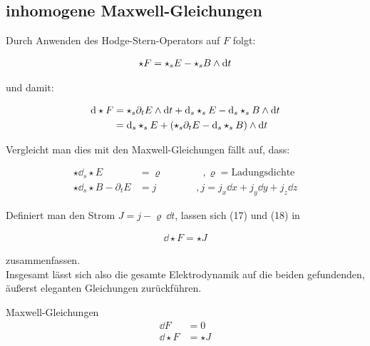\subsection{inhomogene Maxwell-Gleichungen}
Durch Anwenden des Hodge-Stern-Operators auf $F$ folgt:

\begin{align}
\star F = \star_s E - \star_s B \wedge \dd t 
\end{align}

und damit:

\begin{align}
\dd \star F &= \star_s \partial_t E  \wedge \dd t + \dd_s \star_s E - \dd_s \star_s B \wedge \dd t \notag \\
				&= \dd_s \star_s E + (\star_s \partial_t E - \dd_s \star_s B) \wedge \dd t 
\end{align}

Vergleicht man dies mit den Maxwell-Gleichungen fällt auf, dass:

\begin{align}
\star \dd_s \star E &= \varrho \qquad\qquad,\varrho=\text{Ladungsdichte} \\
\star \dd_s\star B - \partial_t E &= j \qquad\qquad ,j=j_x \dd x + j_y \dd y + j_z \dd z
\end{align}

Definiert man den Strom $J=j - \varrho \  \dd t$, lassen sich (17) und (18) in 

\begin{align}
\dd \star F = \star J
\end{align}

zusammenfassen. \\

Insgesamt lässt sich also die gesamte Elektrodynamik auf die beiden gefundenden, äußerst eleganten Gleichungen zurückführen.

\begin{mybox}{Maxwell-Gleichungen}
\begin{align*}
\dd F &= 0 \\
\dd \star F &= \star J
\end{align*}
\end{mybox}
